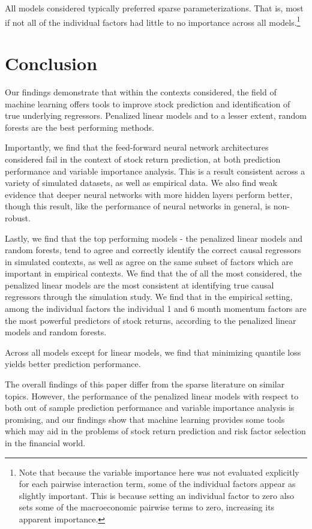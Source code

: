 \documentclass[11pt, a4paper, table]{article}
\begin{document}

All models considered typically preferred sparse parameterizations. That is, most if not all of the individual factors had little to no importance across all models.\footnote{Note that because the variable importance here was not evaluated explicitly for each pairwise interaction term, some of the individual factors appear as slightly important. This is because setting an individual factor to zero also sets some of the macroeconomic pairwise terms to zero, increasing its apparent importance.}

\newpage

\section{Conclusion}

Our findings demonstrate that within the contexts considered, the field of machine learning offers tools to improve stock prediction and identification of true underlying regressors. Penalized linear models and to a lesser extent, random forests are the best performing methods.

Importantly, we find that the feed-forward neural network architectures considered fail in the context of stock return prediction, at both prediction performance and variable importance analysis. This is a result consistent across a variety of simulated datasets, as well as empirical data. We also find weak evidence that deeper neural networks with more hidden layers perform better, though this result, like the performance of neural networks in general, is non-robust.

Lastly, we find that the top performing models - the penalized linear models and random forests, tend to agree and correctly identify the correct causal regressors in simulated contexts, as well as agree on the same subset of factors which are important in empirical contexts. We find that the of all the most considered, the penalized linear models are the most consistent at identifying true causal regressors through the simulation study. We find that in the empirical setting, among the individual factors the individual 1 and 6 month momentum factors are the most powerful predictors of stock returns, according to the penalized linear models and random forests. 

Across all models except for linear models, we find that minimizing quantile loss yields better prediction performance.

The overall findings of this paper differ from the sparse literature on similar topics. However, the performance of the penalized linear models with respect to both out of sample prediction performance and variable importance analysis is promising, and our findings show that machine learning provides some tools which may aid in the problems of stock return prediction and risk factor selection in the financial world. 
\end{document}
